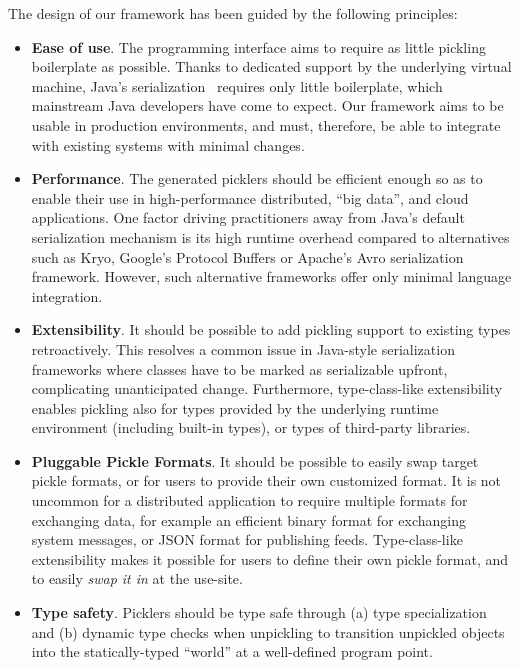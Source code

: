 The design of our framework has been guided by the following principles:
\vspace{-0.3cm}
\begin{itemize}
\item {\bf Ease of use}. The programming interface aims to require as little
pickling boilerplate as possible. Thanks to dedicated support by the
underlying virtual machine, Java's serialization~\cite{JavaSerialization}
requires only little boilerplate, which mainstream Java developers have come
to expect. Our framework aims to be usable in production environments, and
must, therefore, be able to integrate with existing systems with minimal
changes.

\item {\bf Performance}. The generated picklers should be efficient enough  so
as to enable their use in high-performance distributed, ``big data'', and
cloud applications. One factor driving practitioners away from Java's default
serialization mechanism is its high runtime overhead compared to alternatives
such as Kryo, Google's Protocol Buffers or Apache's Avro serialization
framework. However, such alternative frameworks offer only minimal language
integration.

\item {\bf Extensibility}. It should be possible to add pickling support to existing
types retroactively. This resolves a common issue in Java-style serialization
frameworks where classes have to be marked as serializable upfront,
complicating unanticipated change. Furthermore, type-class-like extensibility
enables pickling also for types provided by the underlying runtime environment
(including built-in types), or types of third-party libraries.

\item {\bf Pluggable Pickle Formats}. It should be possible to easily swap target
pickle formats, or for users to provide their own customized format. It is not
uncommon for a distributed application to require multiple formats for
exchanging data, for example an efficient binary format for exchanging system
messages, or JSON format for publishing feeds. Type-class-like extensibility
makes it possible for users to define their own pickle format, and to easily
{\em swap it in} at the use-site.

\item {\bf Type safety}. Picklers should be type safe through (a) type
specialization and (b) dynamic type checks when unpickling to transition
unpickled objects into the statically-typed ``world'' at a well-defined program
point.


\end{itemize}
